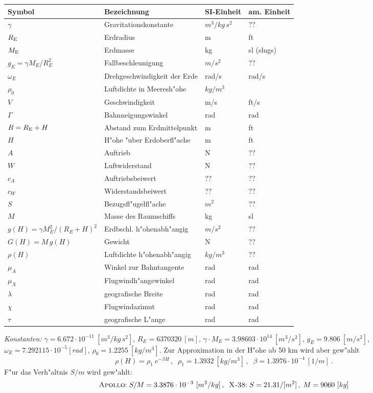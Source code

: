 \documentclass[12pt,a4paper,twoside,leqno]{article}
\begin{document}
\begin{tabular}{|l|l|l|l|}\hline
Symbol & Bezeichnung & SI-Einheit & am. Einheit\\ \hline \hline
$\gamma$ & Gravitationskonstante & $m^3/kg\, s^2$ & ??\\
$R_{\rm E} $ & Erdradius & m  & ft\\
$M_{\rm E} $ & Erdmasse  & kg & sl (slugs)\\
$g_E = \gamma M_E/R^2_E$ & Fallbeschleunigung & $m/s^2$ & ??\\
$\omega_E$ & Drehgeschwindigkeit der Erde & rad/s & rad/s\\
$\rho_0$ & Luftdichte in Meeresh"ohe & $kg/m^3$ &\\ \hline
$V$ & Geschwindigkeit & m/s & ft/s\\
$\Gamma$ & Bahnneigungswinkel & rad & rad\\
$R = R_{\rm E} + H$ & Abstand zum Erdmittelpunkt & m & ft\\
$H$       & H"ohe "uber Erdoberfl"ache & m & ft\\
$A$ & Auftrieb & N & ??\\
$W$ & Luftwiderstand & N & ??\\
$c_A$ & Auftriebsbeiwert & ?? & ??\\
$c_W$ & Widerstandsbeiwert & ?? & ??\\
$S$ & Bezugsfl"ugelfl"ache & $m^2$ & ??\\
$M$ & Masse des Raumschiffs & kg & sl\\
$g(H) = \gamma M^2_E/(R_E + H)^2$ & Erdbschl. h"ohenabh"angig & $m/s^2$ & ??\\
$G(H) = M \, g(H)$ & Gewicht& N & ??\\ \hline
$\rho(H)$ & Luftdichte h"ohenabh"angig & $kg/m^3$ & ??\\
$\mu_A$  & Winkel zur Bahntangente & rad & rad\\
$\mu_X$  & Flugwindh"angewinkel  & rad & rad\\
\hline
$\lambda$ & geografische Breite & rad & rad\\
$\chi$ & Flugwindazimut & rad & rad\\\hline
$\tau$ & geografische L"ange & rad & rad \\ \hline
\end{tabular}
\ec
{\em Konstanten:}
$\gamma = 6.672\cdot10^{-11} \ [m^3/kg \, s^2]$,
$R_E = 6370320 \ [m]$, $\gamma\cdot M_E = 3.98603\cdot 10^{14} \ [m^3/s^2]$,
$g_E = 9.806 \ [m/s^2]$,
$\omega_E = 7.292115\cdot 10^{-5} [rad]$, $ \rho_0 = 1.2255 \ [kg/m^3]$. Zur
Approximation in der H"ohe ab 50 km wird aber gew"ahlt
%
\[
\rho(H) = \rho_1 \ e^{-\beta H}\,,\;\;
\rho_1 = 1.3932 \ [kg/m^3]\,,\;\;
\beta = 1.3976\cdot 10^{-4}\ [1/m]\,.
\]
F"ur das Verh"altnis $S/m$ wird gew"ahlt:
\[
\text{{\sc Apollo}:} \; S/M = 3.3876 \cdot 10^{-3} \ [m^2/kg]\,,\;\;
\text{{\sc X-38}:} \; S = 21.31 / [m^2]\,,\; M = 9060\ [kg]
\]
\end{document}
